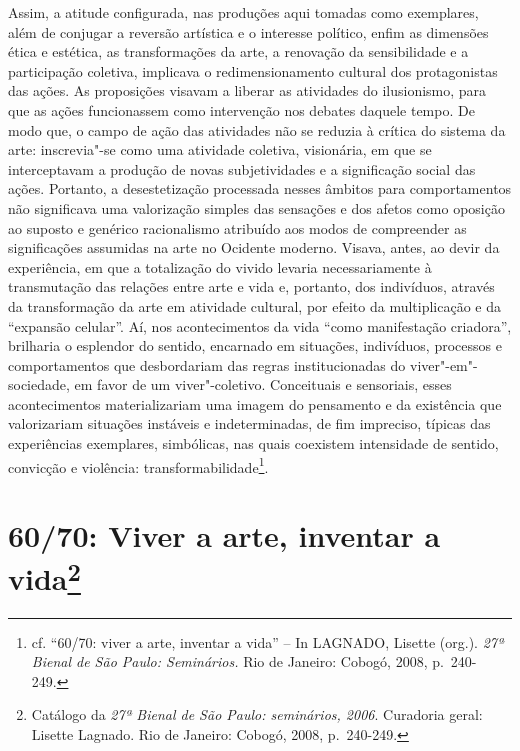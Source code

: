 Assim, a atitude configurada, nas produções aqui tomadas como
exemplares, além de conjugar a reversão artística e o interesse
político, enfim as dimensões ética e estética, as transformações da
arte, a renovação da sensibilidade e a participação coletiva, implicava
o redimensionamento cultural dos protagonistas das ações. As proposições
visavam a liberar as atividades do ilusionismo, para que as ações
funcionassem como intervenção nos debates daquele tempo. De modo que, o
campo de ação das atividades não se reduzia à crítica do sistema da
arte: inscrevia"-se como uma atividade coletiva, visionária, em que se
interceptavam a produção de novas subjetividades e a significação social
das ações. Portanto, a desestetização processada nesses âmbitos para
comportamentos não significava uma valorização simples das sensações e
dos afetos como oposição ao suposto e genérico racionalismo atribuído
aos modos de compreender as significações assumidas na arte no Ocidente
moderno. Visava, antes, ao devir da experiência, em que a totalização do
vivido levaria necessariamente à transmutação das relações entre arte e
vida e, portanto, dos indivíduos, através da transformação da arte em
atividade cultural, por efeito da multiplicação e da ``expansão
celular''. Aí, nos acontecimentos da vida ``como manifestação
criadora'', brilharia o esplendor do sentido, encarnado em situações,
indivíduos, processos e comportamentos que desbordariam das regras
institucionadas do viver"-em"-sociedade, em favor de um viver"-coletivo.
Conceituais e sensoriais, esses acontecimentos materializariam uma
imagem do pensamento e da existência que valorizariam situações
instáveis e indeterminadas, de fim impreciso, típicas das experiências
exemplares, simbólicas, nas quais coexistem intensidade de sentido,
convicção e violência: transformabilidade\footnote{cf. ``60/70: viver a
  arte, inventar a vida'' -- In \textsc{LAGNADO}, Lisette (org.). \emph{27ª
  Bienal de São Paulo: Seminários.} Rio de Janeiro: Cobogó, 2008, p.~240-249.}.

\chapter*{60/70: Viver a arte, inventar a vida\footnote{Catálogo da
  \emph{27ª Bienal de São Paulo: seminários, 2006}. Curadoria geral:
  Lisette Lagnado. Rio de Janeiro: Cobogó, 2008, p.~240-249.}}

